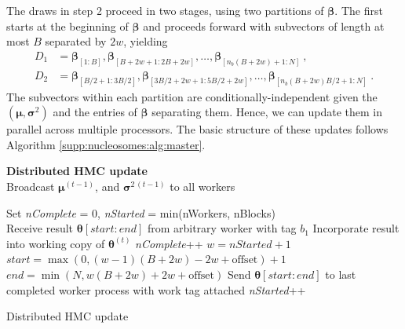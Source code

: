 The draws in step 2 proceed in two stages, using two partitions of $\bm \beta$.
The first starts at the beginning of $\bm \beta$ and proceeds forward with subvectors of length at most $B$ separated by $2w$, yielding
\begin{align}
D_1 &= \bm \beta_{[1 : B]}, \bm \beta_{[B + 2w + 1 : 2B + 2w]}, \ldots, \bm \beta_{[n_b (B + 2w) + 1 : N]} \ , \\
D_2 &= \bm \beta_{[B/2 + 1 : 3B/2]}, \bm \beta_{[3B/2 + 2w + 1 : 5B/2 + 2w]}, \ldots, \bm \beta_{[n_b (B + 2w) B/2 + 1 : N]} \ .
\end{align}
The subvectors within each partition are conditionally-independent given the $(\bm \mu, \bm \sigma^2)$ and the entries of $\bm \beta$ separating them.
Hence, we can update them in parallel across multiple processors.
The basic structure of these updates follows Algorithm \ref{supp:nucleosomes:alg:master}.
%
\begin{algorithm}%
 \hspace{-8pt} \textbf{Distributed HMC update}\\

 Broadcast $\bm \mu^{(t-1)}$, and $\bm \sigma^{2\,(t-1)}$ to all workers \;

  {

 Set \textit{nComplete} = 0, \textit{nStarted} = min(nWorkers, nBlocks) \\
  {
   Receive result $\bm \theta[start:end]$ from arbitrary worker with tag $b_1$ \;
   Incorporate result into working copy of $\bm \theta^{(t)}$ \;
   \textit{nComplete}++ \;
    {
     $w = nStarted + 1$\;
     $start = \max(0, (w - 1)(B + 2w) - 2w + \mbox{offset}) + 1$\;
     $end = \min(N, w(B + 2w) + 2w + \mbox{offset})$\;
     Send $\bm \theta[start:end] $ to last completed worker process with work tag attached\;
     \textit{nStarted}++\;
   }
 }
}

 \caption{Distributed HMC update \label{supp:nucleosomes:alg:master}}
\end{algorithm}

